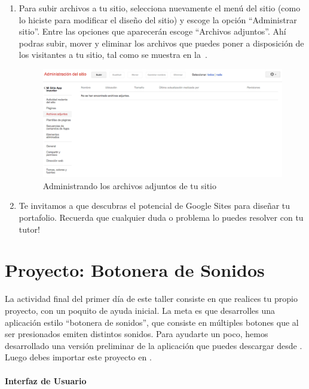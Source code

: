 \documentclass[letterpaper]{article}
\begin{document}
\begin{enumerate}
\item Para subir archivos a tu sitio, selecciona nuevamente el menú
  del sitio (como lo hiciste para modificar el diseño del sitio) y
  escoge la opción ``Administrar sitio''. Entre las opciones que
  aparecerán escoge ``Archivos adjuntos''. Ahí podras subir, mover y
  eliminar los archivos que puedes poner a disposición de los
  visitantes a tu sitio, tal como se muestra en
  la~.

\begin{figure}[H]
\centering
\includegraphics[scale=0.25]{figures/SiteFiles}
\caption{Administrando los archivos adjuntos de tu sitio}
\label{fig:SiteFiles}
\end{figure}



\item Te invitamos a que descubras el potencial de Google Sites para
  diseñar tu portafolio. Recuerda que cualquier duda o problema lo
  puedes resolver con tu tutor!

\end{enumerate}

\section{Proyecto: Botonera de Sonidos}
\label{sec:proy-boton-de}

La actividad final del primer día de este taller consiste en que
realices tu propio proyecto, con un poquito de ayuda inicial. La meta
es que desarrolles una aplicación estilo ``botonera de sonidos'', que
consiste en múltiples botones que al ser presionados emiten distintos
sonidos. Para ayudarte un poco, hemos desarrollado una versión
preliminar de la aplicación que puedes descargar desde
. Luego
debes importar este proyecto en \AppInventor.

\paragraph{Interfaz de Usuario}
\end{document}
